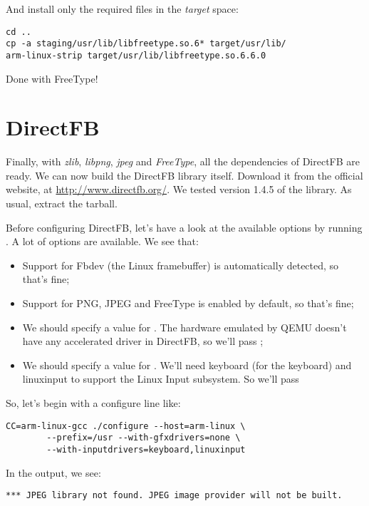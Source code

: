 And install only the required files in the {\em target} space:

\begin{verbatim}
cd ..
cp -a staging/usr/lib/libfreetype.so.6* target/usr/lib/
arm-linux-strip target/usr/lib/libfreetype.so.6.6.0
\end{verbatim}

Done with FreeType!

\section{DirectFB}

Finally, with {\em zlib}, {\em libpng}, {\em jpeg} and {\em FreeType},
all the dependencies of DirectFB are ready. We can now build the
DirectFB library itself. Download it from the official website, at
\url{http://www.directfb.org/}. We tested version 1.4.5 of the
library. As usual, extract the tarball.

Before configuring DirectFB, let's have a look at the available
options by running . A lot of options are
available. We see that:

\begin{itemize}
\item Support for Fbdev (the Linux framebuffer) is automatically
  detected, so that's fine;
\item Support for PNG, JPEG and FreeType is enabled by default, so
  that's fine;
\item We should specify a value for . The
  hardware emulated by QEMU doesn't have any accelerated driver in
  DirectFB, so we'll pass ;
\item We should specify a value for . We'll
  need keyboard (for the keyboard) and linuxinput to support the Linux
  Input subsystem. So we'll pass
\end{itemize}

So, let's begin with a configure line like:

\begin{verbatim}
CC=arm-linux-gcc ./configure --host=arm-linux \
        --prefix=/usr --with-gfxdrivers=none \
        --with-inputdrivers=keyboard,linuxinput
\end{verbatim}

In the output, we see:

\begin{verbatim}
*** JPEG library not found. JPEG image provider will not be built.
\end{verbatim}

